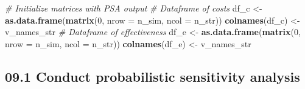 \documentclass[
]{article}
\newenvironment{Shaded}{\begin{snugshade}}{\end{snugshade}}
\newcommand{\CharTok}[1]{\textcolor[rgb]{0.31,0.60,0.02}{#1}}
\newcommand{\CommentTok}[1]{\textcolor[rgb]{0.56,0.35,0.01}{\textit{#1}}}
\newcommand{\ControlFlowTok}[1]{\textcolor[rgb]{0.13,0.29,0.53}{\textbf{#1}}}
\newcommand{\DataTypeTok}[1]{\textcolor[rgb]{0.13,0.29,0.53}{#1}}
\newcommand{\DecValTok}[1]{\textcolor[rgb]{0.00,0.00,0.81}{#1}}
\newcommand{\KeywordTok}[1]{\textcolor[rgb]{0.13,0.29,0.53}{\textbf{#1}}}
\newcommand{\NormalTok}[1]{#1}
\newcommand{\OperatorTok}[1]{\textcolor[rgb]{0.81,0.36,0.00}{\textbf{#1}}}
\newcommand{\StringTok}[1]{\textcolor[rgb]{0.31,0.60,0.02}{#1}}
\begin{document}
\begin{Shaded}
\begin{Highlighting}[]
\CommentTok{# Initialize matrices with PSA output }
\CommentTok{# Dataframe of costs}
\NormalTok{df_c <-}\StringTok{ }\KeywordTok{as.data.frame}\NormalTok{(}\KeywordTok{matrix}\NormalTok{(}\DecValTok{0}\NormalTok{, }
                             \DataTypeTok{nrow =}\NormalTok{ n_sim,}
                             \DataTypeTok{ncol =}\NormalTok{ n_str))}
\KeywordTok{colnames}\NormalTok{(df_c) <-}\StringTok{ }\NormalTok{v_names_str}
\CommentTok{# Dataframe of effectiveness}
\NormalTok{df_e <-}\StringTok{ }\KeywordTok{as.data.frame}\NormalTok{(}\KeywordTok{matrix}\NormalTok{(}\DecValTok{0}\NormalTok{, }
                             \DataTypeTok{nrow =}\NormalTok{ n_sim,}
                             \DataTypeTok{ncol =}\NormalTok{ n_str))}
\KeywordTok{colnames}\NormalTok{(df_e) <-}\StringTok{ }\NormalTok{v_names_str}
\end{Highlighting}
\end{Shaded}

\hypertarget{conduct-probabilistic-sensitivity-analysis}{%
\subsection{09.1 Conduct probabilistic sensitivity
analysis}\label{conduct-probabilistic-sensitivity-analysis}}

\begin{Shaded}
\end{Shaded}
\end{document}
